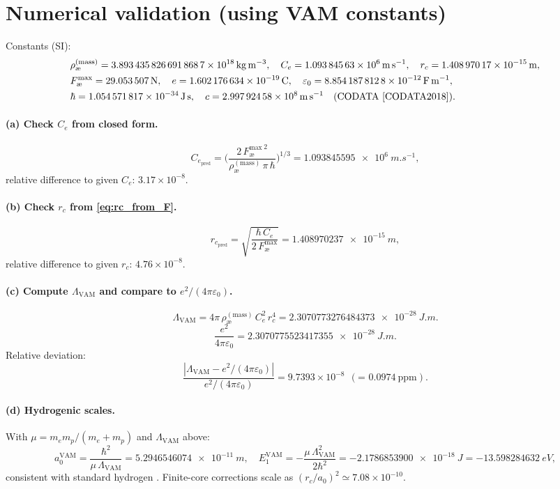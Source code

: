 \documentclass[12pt]{article}
\newcommand{\aeRhoM}{\rho_{\text{\ae}}^{(\text{mass})}}
\newcommand{\Ce}{C_e}
\newcommand{\rc}{r_c}
\newcommand{\Lam}{\Lambda_{\text{VAM}}}
\begin{document}
    \section{Numerical validation (using VAM constants)}
    Constants (SI):
    \[
        \begin{aligned}
            &\aeRhoM = \SI{3.8934358266918687e18}{kg.m^{-3}},\quad
            \Ce = \SI{1.09384563e6}{m.s^{-1}},\quad
            \rc = \SI{1.40897017e-15}{m},\\
            &F_{\text{\ae}}^{\max}=\SI{29.053507}{N},\quad
            e=\SI{1.602176634e-19}{C},\quad
            \varepsilon_0=\SI{8.8541878128e-12}{F.m^{-1}},\\
            &\hbar=\SI{1.054571817e-34}{J.s},\quad
            c=\SI{2.99792458e8}{m.s^{-1}} \quad \text{(CODATA \cite{CODATA2018})}.
        \end{aligned}
    \]

    \paragraph{(a) Check \( \Ce \) from closed form.}
    \[
        \Ce_{\text{pred}}=\Big(\frac{2\,{F_{\text{\ae}}^{\max}}^{\,2}}{\aeRhoM\,\pi\,\hbar}\Big)^{1/3}
        =\SI{1.093845595e6}{m.s^{-1}},
    \]
    relative difference to given \(\Ce\): \(3.17\times 10^{-8}\).

    \paragraph{(b) Check \( \rc \) from \eqref{eq:rc_from_F}.}
    \[
        \rc_{\text{pred}}=\sqrt{\frac{\hbar\,\Ce}{2\,F_{\text{\ae}}^{\max}}}
        =\SI{1.408970237e-15}{m},
    \]
    relative difference to given \(\rc\): \(4.76\times 10^{-8}\).

    \paragraph{(c) Compute \( \Lam \) and compare to \( e^2/(4\pi\varepsilon_0) \).}
    \[
        \Lam = 4\pi\,\aeRhoM\,\Ce^2\,\rc^4
        =\SI{2.3070773276484373e-28}{J.m}.
    \]
    \[
        \frac{e^2}{4\pi\varepsilon_0}
        =\SI{2.3070775523417355e-28}{J.m}.
    \]
    Relative deviation:
    \[
        \frac{|\Lam - e^2/(4\pi\varepsilon_0)|}{e^2/(4\pi\varepsilon_0)}
        = 9.7393\times 10^{-8}\ \ (\text{= }0.0974\ \text{ppm}).
    \]

    \paragraph{(d) Hydrogenic scales.}
    With \(\mu = m_e m_p/(m_e+m_p)\) and \(\Lam\) above:
    \[
        a_0^{\text{VAM}}=\frac{\hbar^2}{\mu\,\Lam}=\SI{5.2946546074e-11}{m},\quad
        E_1^{\text{VAM}}=-\frac{\mu\,\Lam^2}{2\hbar^2}=\SI{-2.1786853900e-18}{J}=-\SI{13.598284632}{eV},
    \]
    consistent with standard hydrogen \cite{BetheSalpeter1957}. Finite-core corrections scale as \((\rc/a_0)^2\simeq 7.08\times 10^{-10}\).
\end{document}
